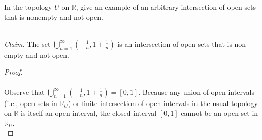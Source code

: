 In the topology $U$ on $\mathbb{R}$, give an example of an arbitrary intersection of open sets that is nonempty and not 
open.

\ \\
\emph{Claim.} The set $\bigcup\limits_{n=1}^{\infty}{(-\frac{1}{n}, 1 + \frac{1}{n})}$ is an intersection of open sets 
that is non-empty and not open.

\begin{proof}\ \\\\
    Observe that $\bigcup\limits_{n=1}^{\infty}{(-\frac{1}{n}, 1 + \frac{1}{n})} = [0, 1]$. Because any union of open
    intervals (i.e., open sets in $\mathbb{R}_U$) or finite intersection of open intervals in the usual topology on 
    $\mathbb{R}$ is itself an open interval, the closed interval $[0, 1]$ cannot be an open set in $\mathbb{R}_U$.
    \ \\
\end{proof}